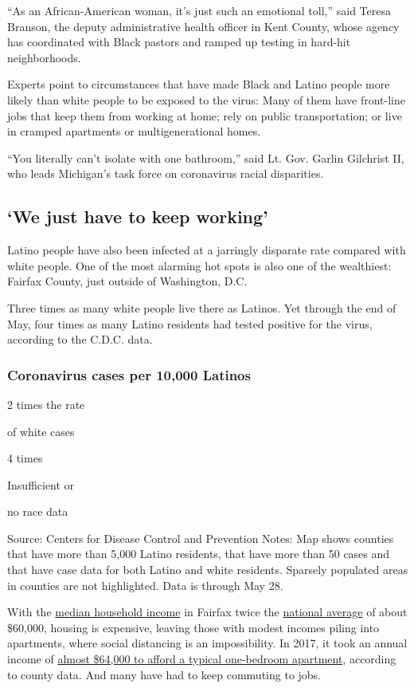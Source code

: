 ``As an African-American woman, it's just such an emotional toll,'' said
Teresa Branson, the deputy administrative health officer in Kent County,
whose agency has coordinated with Black pastors and ramped up testing in
hard-hit neighborhoods.

Experts point to circumstances that have made Black and Latino people
more likely than white people to be exposed to the virus: Many of them
have front-line jobs that keep them from working at home; rely on public
transportation; or live in cramped apartments or multigenerational
homes.

``You literally can't isolate with one bathroom,'' said Lt. Gov. Garlin
Gilchrist II, who leads Michigan's task force on coronavirus racial
disparities.

\hypertarget{we-just-have-to-keep-working}{%
\subsection{`We just have to keep
working'}\label{we-just-have-to-keep-working}}

Latino people have also been infected at a jarringly disparate rate
compared with white people. One of the most alarming hot spots is also
one of the wealthiest: Fairfax County, just outside of Washington, D.C.

Three times as many white people live there as Latinos. Yet through the
end of May, four times as many Latino residents had tested positive for
the virus, according to the C.D.C. data.

\hypertarget{coronavirus-cases-per-10000-latinos}{%
\subsubsection{Coronavirus cases per 10,000
Latinos}\label{coronavirus-cases-per-10000-latinos}}

2 times the rate

of white cases

4 times

Insufficient or

no race data

Source: Centers for Disease Control and Prevention \textbar{} Notes: Map
shows counties that have more than 5,000 Latino residents, that have
more than 50 cases and that have case data for both Latino and white
residents. Sparsely populated areas in counties are not highlighted.
Data is through May 28.

With the
\href{https://www.census.gov/quickfacts/fairfaxcountyvirginia}{median
household income} in Fairfax twice the
\href{https://www.census.gov/quickfacts/fact/table/US/LFE305218\#LFE305218}{national
average} of about \$60,000, housing is expensive, leaving those with
modest incomes piling into apartments, where social distancing is an
impossibility. In 2017, it took an annual income of
\href{https://www.fairfaxcounty.gov/news2/who-we-are-in-fairfax-county-in-2018-annual-demographics-report/}{almost
\$64,000 to afford a typical one-bedroom apartment}, according to county
data. And many have had to keep commuting to jobs.

